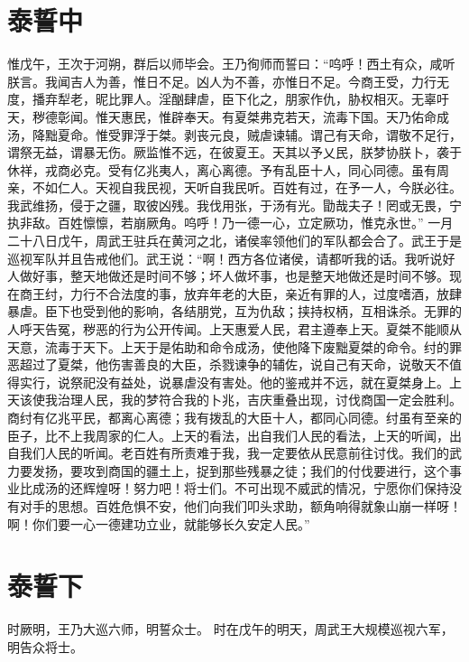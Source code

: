 \documentclass[a4paper,12pt,UTF8,twoside]{ctexbook}
\begin{document}
\chapter{泰誓中}

惟戊午，王次于河朔，群后以师毕会。王乃徇师而誓曰：“呜呼！西土有众，咸听朕言。我闻吉人为善，惟日不足。凶人为不善，亦惟日不足。今商王受，力行无度，播弃犁老，昵比罪人。淫酗肆虐，臣下化之，朋家作仇，胁权相灭。无辜吁天，秽德彰闻。惟天惠民，惟辟奉天。有夏桀弗克若天，流毒下国。天乃佑命成汤，降黜夏命。惟受罪浮于桀。剥丧元良，贼虐谏辅。谓己有天命，谓敬不足行，谓祭无益，谓暴无伤。厥监惟不远，在彼夏王。天其以予乂民，朕梦协朕卜，袭于休祥，戎商必克。受有亿兆夷人，离心离德。予有乱臣十人，同心同德。虽有周亲，不如仁人。天视自我民视，天听自我民听。百姓有过，在予一人，今朕必往。我武维扬，侵于之疆，取彼凶残。我伐用张，于汤有光。勖哉夫子！罔或无畏，宁执非敌。百姓懔懔，若崩厥角。呜呼！乃一德一心，立定厥功，惟克永世。”
一月二十八日戊午，周武王驻兵在黄河之北，诸侯率领他们的军队都会合了。武王于是巡视军队并且告戒他们。武王说：“啊！西方各位诸侯，请都听我的话。我听说好人做好事，整天地做还是时间不够；坏人做坏事，也是整天地做还是时间不够。现在商王纣，力行不合法度的事，放弃年老的大臣，亲近有罪的人，过度嗜酒，放肆暴虐。臣下也受到他的影响，各结朋党，互为仇敌；挟持权柄，互相诛杀。无罪的人呼天告冤，秽恶的行为公开传闻。上天惠爱人民，君主遵奉上天。夏桀不能顺从天意，流毒于天下。上天于是佑助和命令成汤，使他降下废黜夏桀的命令。纣的罪恶超过了夏桀，他伤害善良的大臣，杀戮谏争的辅佐，说自己有天命，说敬天不值得实行，说祭祀没有益处，说暴虐没有害处。他的鉴戒并不远，就在夏桀身上。上天该使我治理人民，我的梦符合我的卜兆，吉庆重叠出现，讨伐商国一定会胜利。商纣有亿兆平民，都离心离德；我有拨乱的大臣十人，都同心同德。纣虽有至亲的臣子，比不上我周家的仁人。上天的看法，出自我们人民的看法，上天的听闻，出自我们人民的听闻。老百姓有所责难于我，我一定要依从民意前往讨伐。我们的武力要发扬，要攻到商国的疆土上，捉到那些残暴之徒；我们的付伐要进行，这个事业比成汤的还辉煌呀！努力吧！将士们。不可出现不威武的情况，宁愿你们保持没有对手的思想。百姓危惧不安，他们向我们叩头求助，额角响得就象山崩一样呀！啊！你们要一心一德建功立业，就能够长久安定人民。”

\chapter{泰誓下}

时厥明，王乃大巡六师，明誓众士。
时在戊午的明天，周武王大规模巡视六军，明告众将士。
\end{document}
